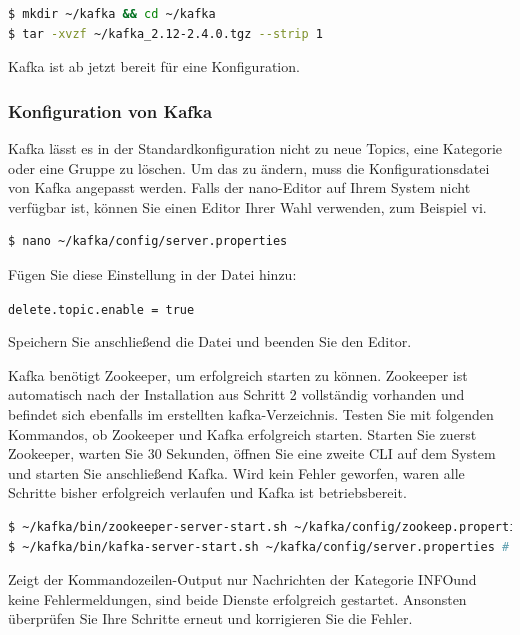 \documentclass[a4paper,titlepage,halfparskip,12pt]{scrreprt}
\begin{document}
\begin{onehalfspacing}
\smallskip

\begin{lstlisting}[language=Bash]
$ mkdir ~/kafka && cd ~/kafka
$ tar -xvzf ~/kafka_2.12-2.4.0.tgz --strip 1
\end{lstlisting}

Kafka ist ab jetzt bereit für eine Konfiguration.

\subsubsection*{Konfiguration von Kafka}

Kafka lässt es in der Standardkonfiguration nicht zu neue Topics, eine Kategorie oder eine Gruppe zu löschen. Um das zu ändern, muss die Konfigurationsdatei von Kafka angepasst werden. Falls der \glqq nano\grqq -Editor auf Ihrem System nicht verfügbar ist, können Sie einen Editor Ihrer Wahl verwenden, zum Beispiel \glqq vi\grqq.

\smallskip

\begin{lstlisting}[language=Bash]
$ nano ~/kafka/config/server.properties
\end{lstlisting}

Fügen Sie diese Einstellung in der Datei hinzu:

\texttt{delete.topic.enable = true}

Speichern Sie anschließend die Datei und beenden Sie den Editor.

Kafka benötigt Zookeeper, um erfolgreich starten zu können. Zookeeper ist automatisch nach der Installation aus Schritt 2 vollständig vorhanden und befindet sich ebenfalls im erstellten \glqq kafka\grqq -Verzeichnis. Testen Sie mit folgenden Kommandos, ob Zookeeper und Kafka erfolgreich starten. Starten Sie zuerst Zookeeper, warten Sie 30 Sekunden, öffnen Sie eine zweite CLI auf dem System und starten Sie anschließend Kafka. Wird kein Fehler geworfen, waren alle Schritte bisher erfolgreich verlaufen und Kafka ist betriebsbereit.

\smallskip

\begin{lstlisting}[language=Bash]
$ ~/kafka/bin/zookeeper-server-start.sh ~/kafka/config/zookeep.properties # Start: zookeeper
$ ~/kafka/bin/kafka-server-start.sh ~/kafka/config/server.properties # Start: kafka
\end{lstlisting}

Zeigt der Kommandozeilen-Output nur Nachrichten der Kategorie \glqq INFO\grqq und keine Fehlermeldungen, sind beide Dienste erfolgreich gestartet. Ansonsten überprüfen Sie Ihre Schritte erneut und korrigieren Sie die Fehler.


\end{onehalfspacing}
\end{document}
